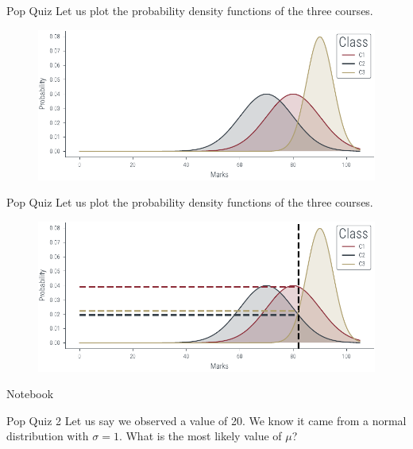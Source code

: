 \documentclass[handout]{beamer}
\begin{document}
\begin{frame}{Pop Quiz}
    Let us plot the probability density functions of the three courses. 
    \begin{figure}
        \includegraphics[width=\textwidth]{../figures/mle/mle-example.pdf}
    \end{figure}
    
\end{frame}

\begin{frame}{Pop Quiz}
    Let us plot the probability density functions of the three courses. 
    \begin{figure}
        \includegraphics[width=\textwidth]{../figures/mle/mle-example-2.pdf}
    \end{figure}
    
\end{frame}

\begin{frame}
  Notebook  
\end{frame}

\begin{frame}{Pop Quiz 2}
    Let us say we observed a value of 20. We know it came from a normal distribution with $\sigma=1$. What is the most likely value of $\mu$?
    


\end{frame}
\end{document}
